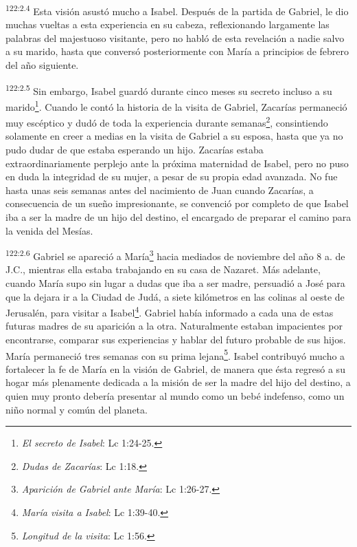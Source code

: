 \par
\textsuperscript{122:2.4} Esta visión asustó mucho a Isabel. Después de la partida de Gabriel, le dio muchas vueltas a esta experiencia en su cabeza, reflexionando largamente las palabras del majestuoso visitante, pero no habló de esta revelación a nadie salvo a su marido, hasta que conversó posteriormente con María a principios de febrero del año siguiente.

\par
\textsuperscript{122:2.5} Sin embargo, Isabel guardó durante cinco meses su secreto incluso a su marido\footnote{\textit{El secreto de Isabel}: Lc 1:24-25.}. Cuando le contó la historia de la visita de Gabriel, Zacarías permaneció muy escéptico y dudó de toda la experiencia durante semanas\footnote{\textit{Dudas de Zacarías}: Lc 1:18.}, consintiendo solamente en creer a medias en la visita de Gabriel a su esposa, hasta que ya no pudo dudar de que estaba esperando un hijo. Zacarías estaba extraordinariamente perplejo ante la próxima maternidad de Isabel, pero no puso en duda la integridad de su mujer, a pesar de su propia edad avanzada. No fue hasta unas seis semanas antes del nacimiento de Juan cuando Zacarías, a consecuencia de un sueño impresionante, se convenció por completo de que Isabel iba a ser la madre de un hijo del destino, el encargado de preparar el camino para la venida del Mesías.

\par
\textsuperscript{122:2.6} Gabriel se apareció a María\footnote{\textit{Aparición de Gabriel ante María}: Lc 1:26-27.} hacia mediados de noviembre del año 8 a. de J.C., mientras ella estaba trabajando en su casa de Nazaret. Más adelante, cuando María supo sin lugar a dudas que iba a ser madre, persuadió a José para que la dejara ir a la Ciudad de Judá, a siete kilómetros en las colinas al oeste de Jerusalén, para visitar a Isabel\footnote{\textit{María visita a Isabel}: Lc 1:39-40.}. Gabriel había informado a cada una de estas futuras madres de su aparición a la otra. Naturalmente estaban impacientes por encontrarse, comparar sus experiencias y hablar del futuro probable de sus hijos. María permaneció tres semanas con su prima lejana\footnote{\textit{Longitud de la visita}: Lc 1:56.}. Isabel contribuyó mucho a fortalecer la fe de María en la visión de Gabriel, de manera que ésta regresó a su hogar más plenamente dedicada a la misión de ser la madre del hijo del destino, a quien muy pronto debería presentar al mundo como un bebé indefenso, como un niño normal y común del planeta.

